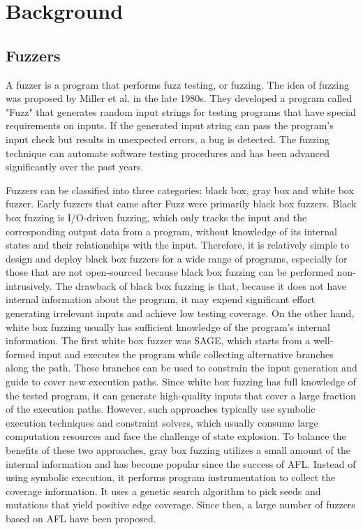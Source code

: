 \chapter{\label{cha:background}Background}


\section{Fuzzers}
A fuzzer is a program that performs fuzz testing, or fuzzing. The idea of fuzzing was proposed by Miller et al. \cite{millerFuzzer} in the late 1980s. They developed a program called "Fuzz" that generates random input strings for testing programs that have special requirements on inputs. If the generated input string can pass the program's input check but results in unexpected errors, a bug is detected. The fuzzing technique can automate software testing procedures and has been advanced significantly over the past years.

Fuzzers can be classified into three categories: black box, gray box and white box fuzzer. Early fuzzers that came after Fuzz were primarily black box fuzzers. Black box fuzzing is I/O-driven fuzzing, which only tracks the input and the corresponding output data from a program, without knowledge of its internal states and their relationships with the input. Therefore, it is relatively simple to design and deploy black box fuzzers for a wide range of programs, especially for those that are not open-sourced because black box fuzzing can be performed non-intrusively. The drawback of black box fuzzing is that, because it does not have internal information about the program, it may expend significant effort generating irrelevant inputs and achieve low testing coverage. On the other hand, white box fuzzing usually has sufficient knowledge of the program's internal information. The first white box fuzzer was SAGE\cite{sage}, which starts from a well-formed input and executes the program while collecting alternative branches along the path. These branches can be used to constrain the input generation and  guide to cover new execution paths. Since white box fuzzing has full knowledge of the tested program, it can generate high-quality inputs that cover a large fraction of the execution paths. However, such approaches typically use symbolic execution techniques and constraint solvers, which usually consume large computation resources and face the challenge of state explosion. To balance the benefits of these two approaches, gray box fuzzing utilizes a small amount of the internal information and has become popular since the success of AFL\cite{afl}. Instead of using symbolic execution, it performs program instrumentation to collect the coverage information. It uses a genetic search algorithm to pick seeds and mutations that yield positive edge coverage. Since then, a large number of fuzzers based on AFL have been proposed\cite{TriforceAFL, kAFL, Driller, CollAFL}.


